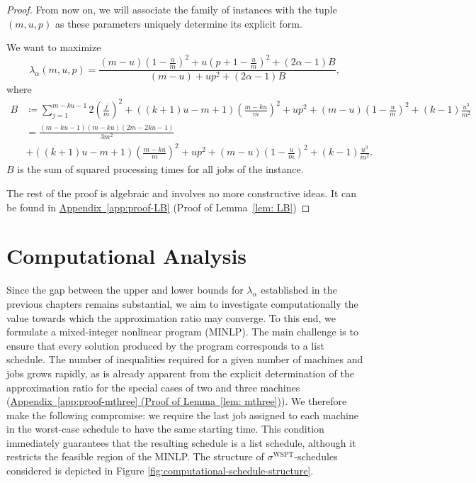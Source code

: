 \documentclass[%
english, titlepage=false %
]{./tum-templates/book/tumbook}
\begin{document}
\begin{proof}
From now on, we will associate the family of instances with the tuple $(m,u,p)$ as these parameters
uniquely determine its explicit form. 


We want to maximize
\[
\lambda_{\alpha}(m,u,p)=\frac{
(m-u)\left(1-\frac um\right)^2
 +u\left(p+1-\frac um\right)^2
 +(2\alpha-1)B
}{
(m-u)+up^2+(2\alpha-1)B
},
\]
where
\[
\begin{aligned}
B&\coloneqq\sum_{j=1}^{m-ku-1}2\left(\frac{j}{m}\right)^2+\left((k+1)u-m+1\right)\left(\frac{m-ku}{m}\right)^2
+up^2
+(m-u)\left(1-\frac um\right)^2
+(k-1)\frac{u^3}{m^2}\\
&=\frac{(m-ku-1)(m-ku)(2m-2ku-1)}{3m^2}  \\
&+\left((k+1)u-m+1\right)\left(\frac{m-ku}{m}\right)^2
+up^2
+(m-u)\left(1-\frac um\right)^2
+(k-1)\frac{u^3}{m^2}.
\end{aligned}
\]
$B$ is the sum of squared processing times for all jobs of the instance. 

The rest of the proof is algebraic and involves no more constructive ideas. 
It can be found in \hyperlink{proof:LB}{Appendix~\ref{app:proof-LB}}
(Proof of Lemma~\ref*{lem: LB})
\end{proof}

\section{Computational Analysis}
Since the gap between the upper and lower bounds for $\lambda_{\alpha}$ established in the previous 
chapters remains substantial, we aim to investigate computationally the value towards which the 
approximation ratio may converge. To this end, we formulate a mixed-integer nonlinear program (MINLP).
The main challenge is to ensure that every solution produced by the program corresponds to a 
list schedule. The number of inequalities required for a given number of machines and jobs grows rapidly,
as is already apparent from the explicit determination of the approximation ratio for the special 
cases of two and three machines (\hyperlink{proof:mthree}{Appendix~\ref*{app:proof-mthree}
(Proof of Lemma~\ref*{lem: mthree})}). We therefore make the following compromise: we require the last 
job assigned to each machine in the worst-case schedule to have the same starting time.
This condition immediately guarantees that the resulting schedule is a list schedule,
although it restricts the feasible region of the MINLP.
The structure of $\sigma^{\mathrm{WSPT}}$-schedules considered is depicted in Figure \ref{fig:computational-schedule-structure}.
\end{document}
